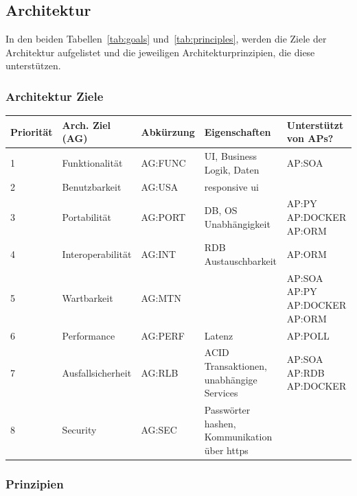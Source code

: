 \subsection{Architektur}

In den beiden Tabellen~\ref{tab:goals} und~\ref{tab:principles}, werden die Ziele der Architektur aufgelistet
und die jeweiligen Architekturprinzipien, die diese unterstützen.

\subsubsection{Architektur Ziele}
\begin{center}
    \begin{tabular}{|l|l|l| p{5cm} |p{2.5cm}|}
        \hline
        \textbf{Priorität} & \textbf{Arch. Ziel (AG)} & \textbf{Abkürzung} & \textbf{Eigenschaften} & \textbf{Unterstützt von APs?} \\
        \hline
        1 & Funktionalität & AG:FUNC & UI, Business Logik, Daten & AP:SOA \\
        2 & Benutzbarkeit & AG:USA & responsive ui &  \\
        3 & Portabilität & AG:PORT & DB, OS Unabhängigkeit & AP:PY AP:DOCKER AP:ORM\\
        4 & Interoperabilität & AG:INT & RDB Austauschbarkeit & AP:ORM \\
        5 & Wartbarkeit & AG:MTN & & AP:SOA AP:PY AP:DOCKER AP:ORM\\
        6 & Performance & AG:PERF & Latenz & AP:POLL \\
        7 & Ausfallsicherheit & AG:RLB & ACID Transaktionen, unabhängige Services & AP:SOA AP:RDB AP:DOCKER\\
        8 & Security & AG:SEC & Passwörter hashen, Kommunikation über https &  \\
        \hline
    \end{tabular}
    \label{tab:goals}
\end{center}
\subsubsection{Prinzipien}

